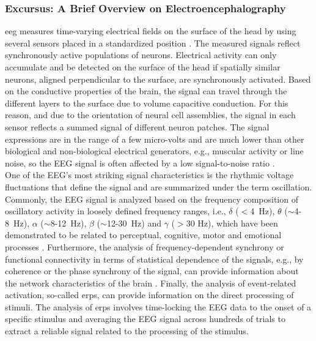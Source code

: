 \begin{tcolorbox}
    \subsubsection{Excursus: A Brief Overview on Electroencephalography}
    \Gls{eeg} measures time-varying electrical fields on the surface of the head by using several sensors placed in a standardized position \cite{Jackson2014}. The measured signals reflect synchronously active populations of neurons. Electrical activity can only accumulate and be detected on the surface of the head if spatially similar neurons, aligned perpendicular to the surface, are synchronously activated. Based on the conductive properties of the brain, the signal can travel through the different layers to the surface due to volume capacitive conduction. For this reason, and due to the orientation of neural cell assemblies, the signal in each sensor reflects a summed signal of different neuron patches. The signal expressions are in the range of a few micro-volts and are much lower than other biological and non-biological electrical generators, e.g., muscular activity or line noise, so the EEG signal is often affected by a low signal-to-noise ratio \cite{CohenX2017}.\\
    One of the EEG's most striking signal characteristics is the rhythmic voltage fluctuations that define the signal and are summarized under the term oscillation. Commonly, the EEG signal is analyzed based on the frequency composition of oscillatory activity in loosely defined frequency ranges, i.e., $\delta$ ($<$4~Hz), $\theta$ ($\sim$4-8~Hz), $\alpha$ ($\sim$8-12~Hz), $\beta$ ($\sim$12-30~Hz) and $\gamma$ ($>$30 Hz), which have been demonstrated to be related to perceptual, cognitive, motor and emotional processes \cite{CohenX2017}. Furthermore, the analysis of frequency-dependent synchrony or functional connectivity in terms of statistical dependence of the signals, e.g., by coherence or the phase synchrony of the signal, can provide information about the network characteristics of the brain \cite{Siegel2012}. Finally, the analysis of event-related activation, so-called \glspl{erp}, can provide information on the direct processing of stimuli. The analysis of \glspl{erp} involves time-locking the EEG data to the onset of a specific stimulus and averaging the EEG signal across hundreds of trials to extract a reliable signal related to the processing of the stimulus.
\end{tcolorbox}

